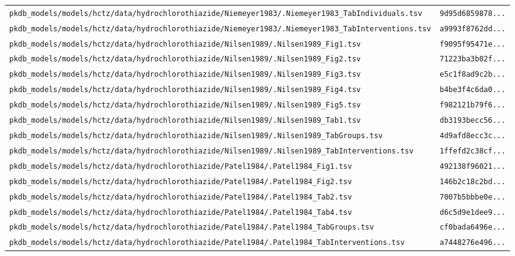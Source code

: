 \documentclass{article}
\begin{document}
\begin{longtable}{ll}
\texttt{pkdb\_models/models/hctz/data/hydrochlorothiazide/Niemeyer1983/.Niemeyer1983\_TabIndividuals.tsv} & \texttt{9d95d6859878...} \\
\texttt{pkdb\_models/models/hctz/data/hydrochlorothiazide/Niemeyer1983/.Niemeyer1983\_TabInterventions.tsv} & \texttt{a9993f8762dd...} \\
\texttt{pkdb\_models/models/hctz/data/hydrochlorothiazide/Nilsen1989/.Nilsen1989\_Fig1.tsv} & \texttt{f9095f95471e...} \\
\texttt{pkdb\_models/models/hctz/data/hydrochlorothiazide/Nilsen1989/.Nilsen1989\_Fig2.tsv} & \texttt{71223ba3b02f...} \\
\texttt{pkdb\_models/models/hctz/data/hydrochlorothiazide/Nilsen1989/.Nilsen1989\_Fig3.tsv} & \texttt{e5c1f8ad9c2b...} \\
\texttt{pkdb\_models/models/hctz/data/hydrochlorothiazide/Nilsen1989/.Nilsen1989\_Fig4.tsv} & \texttt{b4be3f4c6da0...} \\
\texttt{pkdb\_models/models/hctz/data/hydrochlorothiazide/Nilsen1989/.Nilsen1989\_Fig5.tsv} & \texttt{f982121b79f6...} \\
\texttt{pkdb\_models/models/hctz/data/hydrochlorothiazide/Nilsen1989/.Nilsen1989\_Tab1.tsv} & \texttt{db3193becc56...} \\
\texttt{pkdb\_models/models/hctz/data/hydrochlorothiazide/Nilsen1989/.Nilsen1989\_TabGroups.tsv} & \texttt{4d9afd8ecc3c...} \\
\texttt{pkdb\_models/models/hctz/data/hydrochlorothiazide/Nilsen1989/.Nilsen1989\_TabInterventions.tsv} & \texttt{1ffefd2c38cf...} \\
\texttt{pkdb\_models/models/hctz/data/hydrochlorothiazide/Patel1984/.Patel1984\_Fig1.tsv} & \texttt{492138f96021...} \\
\texttt{pkdb\_models/models/hctz/data/hydrochlorothiazide/Patel1984/.Patel1984\_Fig2.tsv} & \texttt{146b2c18c2bd...} \\
\texttt{pkdb\_models/models/hctz/data/hydrochlorothiazide/Patel1984/.Patel1984\_Tab2.tsv} & \texttt{7007b5bbbe0e...} \\
\texttt{pkdb\_models/models/hctz/data/hydrochlorothiazide/Patel1984/.Patel1984\_Tab4.tsv} & \texttt{d6c5d9e1dee9...} \\
\texttt{pkdb\_models/models/hctz/data/hydrochlorothiazide/Patel1984/.Patel1984\_TabGroups.tsv} & \texttt{cf0bada6496e...} \\
\texttt{pkdb\_models/models/hctz/data/hydrochlorothiazide/Patel1984/.Patel1984\_TabInterventions.tsv} & \texttt{a7448276e496...} \\

\end{longtable}
\end{document}
